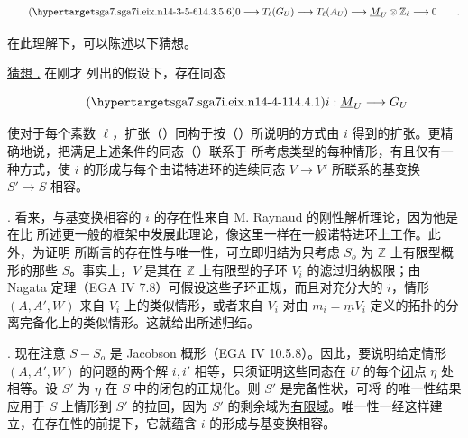 \begin{equation}\tag{\SGARefTarget{sga7.sga7i.eix.n14-3-5-6}{14.3.5.6}}
 0\longrightarrow T_\ell(G_U)\longrightarrow T_\ell(A_U)
 \longrightarrow\underline M_U\otimes\mathbb Z_\ell
 \longrightarrow0\qquad .
\end{equation}

在此理解下，可以陈述以下猜想。


\par\medskip
\noindent
\underline{猜想 .}  在刚才  列出的假设下，存在同态

\begin{equation}\tag{\SGARefTarget{sga7.sga7i.eix.n14-4-1}{14.4.1}}
 i:\underline M_U\longrightarrow G_U
\end{equation}

\noindent
使对于每个素数 $\ell$，扩张（）同构于按（）所说明的方式由 $i$ 得到的扩张。更精确地说，把满足上述条件的同态（）联系于  所考虑类型的每种情形，有且仅有一种方式，使 $i$ 的形成与每个由诺特进环的连续同态 $V\longrightarrow V'$ 所联系的基变换 $S'\longrightarrow S$ 相容。

\medskip
\noindent
{}. 看来，与基变换相容的 $i$ 的存在性来自 M. Raynaud 的刚性解析理论，因为他是在比  所述更一般的框架中发展此理论，像这里一样在一般诺特进环上工作。此外，为证明  所断言的存在性与唯一性，可立即归结为只考虑 $S_o$ 为 $\mathbb Z$ 上有限型概形的那些 $S$。事实上，$V$ 是其在 $\mathbb Z$ 上有限型的子环 $V_i$ 的滤过归纳极限；由 Nagata 定理（EGA IV 7.8）可假设这些子环正规，而且对充分大的 $i$，情形 $(A,A',W)$ 来自 $V_i$ 上的类似情形，或者来自 $V_i$ 对由 $m_i=\underline m V_i$ 定义的拓扑的分离完备化上的类似情形。这就给出所述归结。

\medskip
\noindent
{}. 现在注意 $S-S_o$ 是 Jacobson 概形（EGA IV 10.5.8）。因此，要说明给定情形 $(A,A',W)$ 的问题的两个解 $i,i'$ 相等，只须证明这些同态在 $U$ 的每个\underline{闭}点 $\eta$ 处相等。设 $S'$ 为 $\eta$ 在 $S$ 中的闭包的正规化。则 $S'$ 是完备性状，可将  的唯一性结果应用于 $S$ 上情形到 $S'$ 的拉回，因为 $S'$ 的剩余域为\underline{有限域}。唯一性一经这样建立，在存在性的前提下，它就蕴含 $i$ 的形成与基变换相容。

